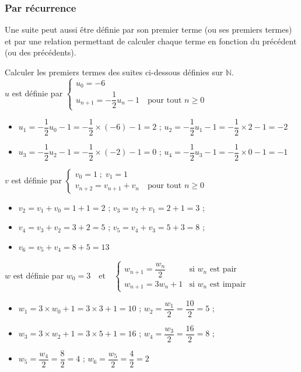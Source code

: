 \documentclass[french]{book}
\newcommand{\N}{\mathbb {N}}
\newcommand{\se}{\geq}
\begin{document}
\subsubsection*{Par récurrence}
Une suite peut aussi être définie par son premier terme (ou ses premiers termes) et par une relation permettant de calculer chaque terme en fonction du précédent (ou des précédents).

\begin{exemple}
Calculer les premiers termes des suites ci-dessous définies sur $\N$.\\

$u$ est définie par
$
\left\{\begin{array}{l}
u_0=-6\\
u_{n+1}=-\dfrac{1}{2}u_{n}-1 \quad \text{pour tout }n\se0
\end{array}
\right.
$

\begin{itemize}
\item $u_1=-\dfrac{1}{2}u_0-1=-\dfrac{1}{2}\times(-6)-1=2$ ; $u_2=-\dfrac{1}{2}u_1-1=-\dfrac{1}{2}\times2-1=-2$
\item $u_3=-\dfrac{1}{2}u_2-1=-\dfrac{1}{2}\times(-2)-1=0$ ; $u_4=-\dfrac{1}{2}u_3-1=-\dfrac{1}{2}\times0-1=-1$
\end{itemize}

$v$ est définie par
$
\left\{\begin{array}{l}
v_0=1\; ; \; v_1=1\\
v_{n+2}=v_{n+1}+v_{n} \quad \text{pour tout }n\se0
\end{array}
\right.
$

\begin{itemize}
\item $v_2=v_1+v_0=1+1=2$ ; $v_3=v_2+v_1=2+1=3$ ;
\item $v_4=v_3+v_2=3+2=5$ ; $v_5=v_4+v_3=5+3=8$ ;
\item  $v_6=v_5+v_4=8+5=13$
\end{itemize}

$w$ est définie par
$w_0=3
\quad
\text{et}
\quad
\begin{cases}
w_{n+1}=\dfrac{w_{n}}{2}&\text{si $w_n$ est pair}\\
w_{n+1}=3w_{n}+1&\text{si $w_n$ est impair}
\end{cases}
$


\begin{itemize}
\item $w_1=3\times w_0 + 1 = 3\times3 +1 = 10$ ; $w_2=\dfrac{w_1}{2}=\dfrac{10}{2}=5$ ; \item $w_3=3\times w_2 + 1 = 3\times5 +1 = 16$ ; $w_4=\dfrac{w_3}{2}=\dfrac{16}{2}=8$ ; \item $w_5=\dfrac{w_4}{2}=\dfrac{8}{2}=4$ ; $w_6=\dfrac{w_5}{2}=\dfrac{4}{2}=2$
\end{itemize}
\end{exemple}
\newpage
\end{document}
